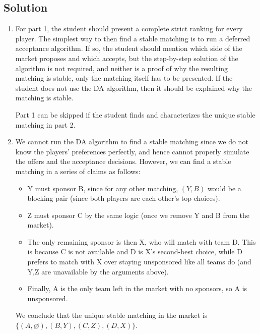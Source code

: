 \documentclass[a4paper]{article}
\begin{document}
\subsection*{Solution}
\begin{enumerate}
	\item For part 1, the student should present a complete strict ranking for every player. The simplest way to then find a stable matching is to run a deferred acceptance algorithm. If so, the student should mention which side of the market proposes and which accepts, but the step-by-step solution of the algorithm is not required, and neither is a proof of why the resulting matching is stable, only the matching itself has to be presented. If the student does not use the DA algorithm, then it should be explained why the matching is stable. 
	
	Part 1 can be skipped if the student finds and characterizes the unique stable matching in part 2.
	
	\item We cannot run the DA algorithm to find a stable matching since we do not know the players' preferences perfectly, and hence cannot properly simulate the offers and the acceptance decisions. However, we can find a stable matching in a series of claims as follows:
	\begin{itemize}
		\item Y must sponsor B, since for any other matching, $(Y,B)$ would be a blocking pair (since both players are each other's top choices).
		\item Z must sponsor C by the same logic (once we remove Y and B from the market).
		\item The only remaining sponsor is then X, who will match with team D. This is because C is not available and D is X's second-best choice, while D prefers to match with X over staying unsponsored like all teams do (and Y,Z are unavailable by the arguments above).
		\item Finally, A is the only team left in the market with no sponsors, so A is unsponsored.
	\end{itemize}
	We conclude that the unique stable matching in the market is $\big\{ (A,\varnothing), (B,Y), (C,Z), (D,X) \big\}$.
\end{enumerate}
\fi
\end{document}
